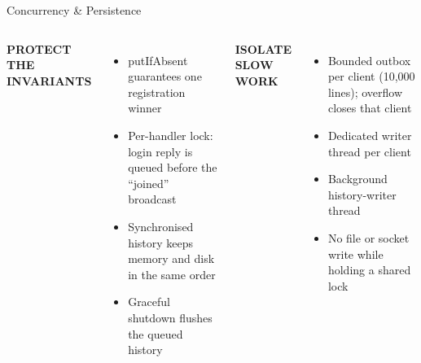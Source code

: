 \documentclass[aspectratio=169,11pt]{beamer}
\newcommand{\code}[1]{{\ttfamily\color{navy}#1}}
\newcommand{\kicker}[1]{{\color{amber}\bfseries\scriptsize\MakeUppercase{#1}}}
\begin{document}
\begin{frame}[t]{Concurrency \& Persistence}
  \vspace{2mm}
  \begin{columns}[T]
    \kicker{Protect the invariants}
    \begin{itemize}\footnotesize\setlength\itemsep{2pt}
      \item \code{putIfAbsent} guarantees one registration winner
      \item Per-handler lock: login reply is queued before the ``joined'' broadcast
      \item Synchronised history keeps memory and disk in the same order
      \item Graceful shutdown flushes the queued history
    \end{itemize}
    \kicker{Isolate slow work}
    \begin{itemize}\footnotesize\setlength\itemsep{2pt}
      \item Bounded outbox per client (10,000 lines); overflow closes that client
      \item Dedicated writer thread per client
      \item Background history-writer thread
      \item No file or socket write while holding a shared lock
    \end{itemize}
  \end{columns}
  \vspace{2mm}
\end{frame}
\end{document}
